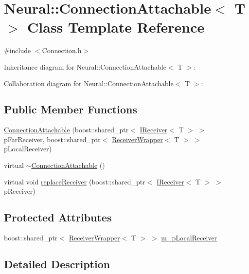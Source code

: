 \hypertarget{class_neural_1_1_connection_attachable}{
\section{Neural::ConnectionAttachable$<$ T $>$ Class Template Reference}
\label{class_neural_1_1_connection_attachable}
}


{\ttfamily \#include $<$Connection.h$>$}



Inheritance diagram for Neural::ConnectionAttachable$<$ T $>$:


Collaboration diagram for Neural::ConnectionAttachable$<$ T $>$:
\subsection*{Public Member Functions}
\begin{DoxyCompactItemize}
\item 
\hyperlink{class_neural_1_1_connection_attachable_a99dc37b349cf916b49584ece4b357362}{ConnectionAttachable} (boost::shared\_\-ptr$<$ \hyperlink{class_neural_1_1_i_receiver}{IReceiver}$<$ T $>$ $>$ pFarReceiver, boost::shared\_\-ptr$<$ \hyperlink{class_neural_1_1_receiver_wrapper}{ReceiverWrapper}$<$ T $>$ $>$ pLocalReceiver)
\item 
virtual \hyperlink{class_neural_1_1_connection_attachable_a0e3c2a40ffd0bf4a34d47171c8d146c2}{$\sim$ConnectionAttachable} ()
\item 
virtual void \hyperlink{class_neural_1_1_connection_attachable_a61c964236a72f64e631aa75c1f4489b1}{replaceReceiver} (boost::shared\_\-ptr$<$ \hyperlink{class_neural_1_1_i_receiver}{IReceiver}$<$ T $>$ $>$ pReceiver)
\end{DoxyCompactItemize}
\subsection*{Protected Attributes}
\begin{DoxyCompactItemize}
\item 
boost::shared\_\-ptr$<$ \hyperlink{class_neural_1_1_receiver_wrapper}{ReceiverWrapper}$<$ T $>$ $>$ \hyperlink{class_neural_1_1_connection_attachable_a099beddd9c5d78bf8c17739d6188cefe}{m\_\-pLocalReceiver}
\end{DoxyCompactItemize}


\subsection{Detailed Description}
